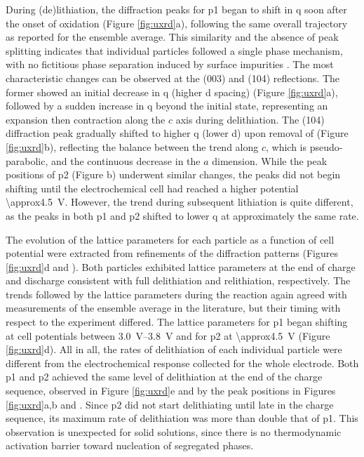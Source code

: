 \documentclass{article}
\begin{document}
During (de)lithiation, the diffraction peaks for \gls{p1} began to
shift in \gls{q} soon after the onset of oxidation (Figure
\ref{fig:uxrd}a), following the same overall trajectory as reported
for the ensemble average\cite{robert2015}. This similarity and the
absence of peak splitting indicates that individual particles followed
a single phase mechanism, with no fictitious phase separation induced
by surface impurities \cite{grenier2017}. The most characteristic
changes can be observed at the (003) and (104) reflections. The former
showed an initial decrease in \gls{q} (higher d spacing) (Figure
\ref{fig:uxrd}a), followed by a sudden increase in \gls{q} beyond the
initial state, representing an expansion then contraction along the
$c$ axis during delithiation\cite{robert2015}. The (104) diffraction
peak gradually shifted to higher \gls{q} (lower d) upon removal of
 (Figure \ref{fig:uxrd}b), reflecting the balance between the
trend along $c$, which is pseudo-parabolic, and the continuous
decrease in the $a$ dimension.\cite{robert2015} While the peak
positions of \gls{p2} (Figure b) underwent
similar changes, the peaks did not begin shifting until the
electrochemical cell had reached a higher potential
\SI{\approx4.5}{\volt}. However, the trend during subsequent
lithiation is quite different, as the peaks in both \gls{p1} and
\gls{p2} shifted to lower \gls{q} at approximately the same rate.

The evolution of the lattice parameters for each particle as a
function of cell potential were extracted from refinements of the
diffraction patterns (Figures \ref{fig:uxrd}d and
). Both particles exhibited lattice parameters
at the end of charge and discharge consistent with full delithiation
and relithiation, respectively\cite{novak2015}. The trends followed by
the lattice parameters during the reaction again agreed with
measurements of the ensemble average in the literature\cite{novak2015,
  faenza2018}, but their timing with respect to the experiment
differed. The lattice parameters for \gls{p1} began shifting at cell
potentials between \SIrange{3.0}{3.8}{\volt} and for \gls{p2} at
\SI{\approx4.5}{\volt} (Figure \ref{fig:uxrd}d). All in all, the rates
of delithiation of each individual particle were different from the
electrochemical response collected for the whole electrode. Both
\gls{p1} and \gls{p2} achieved the same level of delithiation at the
end of the charge sequence, observed in Figure \ref{fig:uxrd}e and by
the peak positions in Figures \ref{fig:uxrd}a,b and
. Since \gls{p2} did not start delithiating
until late in the charge sequence, its maximum rate of delithiation
was more than double that of \gls{p1}. This observation is unexpected
for solid solutions, since there is no thermodynamic activation
barrier toward nucleation of segregated phases.
\end{document}
